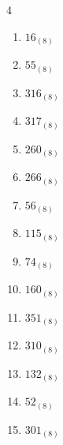 \begin{multicols}{4}
\begin{enumerate}
        \phantom{$=11$}

  \item $16_{(8)}$

        \phantom{$=14$}

  \item $55_{(8)}$

        \phantom{$=45$}

  \item $316_{(8)}$

        \phantom{$=206$}

  \item $317_{(8)}$

        \phantom{$=207$}

  \item $260_{(8)}$

        \phantom{$=176$}

  \item $266_{(8)}$

        \phantom{$=182$}

  \item $56_{(8)}$

        \phantom{$=46$}

  \item $115_{(8)}$

        \phantom{$=77$}

  \item $74_{(8)}$

        \phantom{$=60$}

  \item $160_{(8)}$

        \phantom{$=112$}

\columnbreak %

  \item $351_{(8)}$

        \phantom{$=233$}

  \item $310_{(8)}$

        \phantom{$=200$}

  \item $132_{(8)}$

        \phantom{$=90$}

  \item $52_{(8)}$

        \phantom{$=42$}

  \item $301_{(8)}$

        \phantom{$=193$}


\end{enumerate}
\end{multicols}
